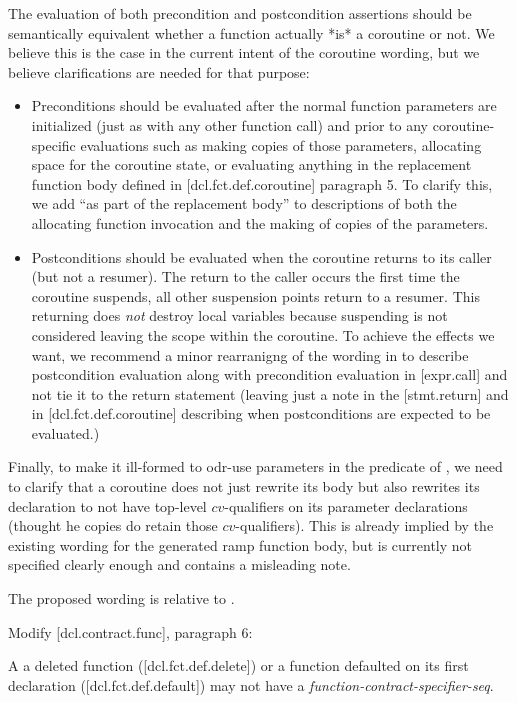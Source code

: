 The evaluation of both precondition and postcondition assertions should be semantically equivalent whether a function actually *is* a coroutine or not.  We believe this is the case in the current intent of the coroutine wording, but we believe clarifications are needed for that purpose:
\begin{itemize}
\item Preconditions should be evaluated after the normal function parameters are initialized (just as with any other function call) and prior to any coroutine-specific evaluations such as making copies of those parameters, allocating space for the coroutine state, or evaluating anything in the replacement function body defined in [dcl.fct.def.coroutine] paragraph 5.  To clarify this, we add ``as part of the replacement body'' to descriptions of both the allocating function invocation and the making of copies of the parameters.
\item Postconditions should be evaluated when the coroutine returns to its caller (but not a resumer).  The return to the caller occurs the first time the coroutine suspends, all other suspension points return to a resumer.   This returning does \emph{not} destroy local variables because suspending is not considered leaving the scope within the coroutine.   To achieve the effects we want, we recommend a minor rearranigng of the wording in \cite{P2900R8} to describe postcondition evaluation along with precondition evaluation in [expr.call] and not tie it to the return statement (leaving just a note in the [stmt.return] and in [dcl.fct.def.coroutine] describing when postconditions are expected to be evaluated.)
\end{itemize}


Finally, to make it ill-formed to odr-use parameters in the predicate of , we need to clarify that a coroutine does not just rewrite its body but also rewrites its declaration to not have top-level $cv$-qualifiers on its parameter declarations (thought he copies do retain those $cv$-qualifiers).  This is already implied by the existing wording for the generated ramp function body, but is currently not specified clearly enough and contains a misleading note.

The proposed wording is relative to \cite{P2900R8}.

Modify [dcl.contract.func], paragraph 6:
\begin{adjustwidth}{0.5cm}{0.5cm}
A a deleted function ([dcl.fct.def.delete])\removed{,} or a function defaulted on its first declaration ([dcl.fct.def.default]) may not have a \emph{function-contract-specifier-seq}.
\end{adjustwidth}

